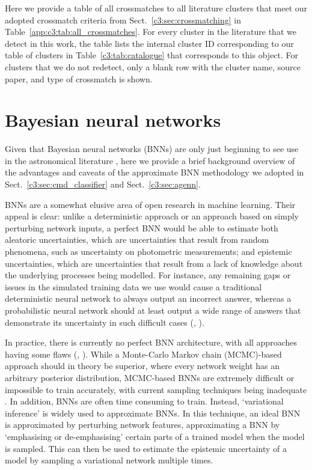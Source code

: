 Here we provide a table of all crossmatches to all literature clusters that meet our adopted crossmatch criteria from Sect.~\ref{c3:sec:crossmatching} in Table~\ref{app:c3:tab:all_crossmatches}. For every cluster in the literature that we detect in this work, the table lists the internal cluster ID corresponding to our table of clusters in Table~\ref{c3:tab:catalogue} that corresponds to this object. For clusters that we do not redetect, only a blank row with the cluster name, source paper, and type of crossmatch is shown.


\section{Bayesian neural networks}\label{app:c3:bayesian_nets}

Given that Bayesian neural networks (BNNs) are only just beginning to see use in the astronomical literature \citep[e.g.][]{huertas-company_hubble_2019}, here we provide a brief background overview of the advantages and caveats of the approximate BNN methodology we adopted in Sect.~\ref{c3:sec:cmd_classifier} and Sect.~\ref{c3:sec:agenn}.

BNNs are a somewhat elusive area of open research in machine learning. Their appeal is clear: unlike a deterministic approach or an approach based on simply perturbing network inputs, a perfect BNN would be able to estimate both aleatoric uncertainties, which are uncertainties that result from random phenomena, such as uncertainty on photometric measurements; and epistemic uncertainties, which are uncertainties that result from a lack of knowledge about the underlying processes being modelled. For instance, any remaining gaps or issues in the simulated training data we use would cause a traditional deterministic neural network to always output an incorrect answer, whereas a probabilistic neural network should at least output a wide range of answers that demonstrate its uncertainty in such difficult cases (\cite{goan_bayesian_2020}, \cite{jospin_hands-bayesian_2022}).

In practice, there is currently no perfect BNN architecture, with all approaches having some flaws (\cite{goan_bayesian_2020}, \cite{jospin_hands-bayesian_2022}). While a Monte-Carlo Markov chain (MCMC)-based approach should in theory be superior, where every network weight has an arbitrary posterior distribution, MCMC-based BNNs are extremely difficult or impossible to train accurately, with current sampling techniques being inadequate \citep{goan_bayesian_2020}. In addition, BNNs are often time consuming to train. Instead, `variational inference' is widely used to approximate BNNs. In this technique, an ideal BNN is approximated by perturbing network features, approximating a BNN by `emphasising or de-emphasising' certain parts of a trained model when the model is sampled. This can then be used to estimate the epistemic uncertainty of a model by sampling a variational network multiple times.

